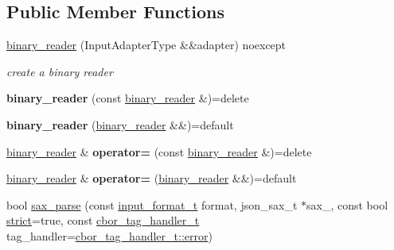 \subsection*{Public Member Functions}
\begin{DoxyCompactItemize}
\item 
\hyperlink{classnlohmann_1_1detail_1_1binary__reader_a2aee4c3507eca623f7cec32544fdc5b2}{binary\+\_\+reader} (Input\+Adapter\+Type \&\&adapter) noexcept
\begin{DoxyCompactList}\small\item\em create a binary reader \end{DoxyCompactList}\item 
\mbox{\label{classnlohmann_1_1detail_1_1binary__reader_ab29d56b1e980a7b9a3383cf1ce862d1b}} 
{\bfseries binary\+\_\+reader} (const \hyperlink{classnlohmann_1_1detail_1_1binary__reader}{binary\+\_\+reader} \&)=delete
\item 
\mbox{\label{classnlohmann_1_1detail_1_1binary__reader_acca2c4076df85f27dc1c904475e05c26}} 
{\bfseries binary\+\_\+reader} (\hyperlink{classnlohmann_1_1detail_1_1binary__reader}{binary\+\_\+reader} \&\&)=default
\item 
\mbox{\label{classnlohmann_1_1detail_1_1binary__reader_a35abcd6b3231a4c9d651f9c0eb610c96}} 
\hyperlink{classnlohmann_1_1detail_1_1binary__reader}{binary\+\_\+reader} \& {\bfseries operator=} (const \hyperlink{classnlohmann_1_1detail_1_1binary__reader}{binary\+\_\+reader} \&)=delete
\item 
\mbox{\label{classnlohmann_1_1detail_1_1binary__reader_ad3dc8b0f8ef6035465c14ed7dcbb67d4}} 
\hyperlink{classnlohmann_1_1detail_1_1binary__reader}{binary\+\_\+reader} \& {\bfseries operator=} (\hyperlink{classnlohmann_1_1detail_1_1binary__reader}{binary\+\_\+reader} \&\&)=default
\item 
bool \hyperlink{classnlohmann_1_1detail_1_1binary__reader_ab4afd9ee276bbb15a0f898061aad94dd}{sax\+\_\+parse} (const \hyperlink{namespacenlohmann_1_1detail_aa554fc6a11519e4f347deb25a9f0db40}{input\+\_\+format\+\_\+t} format, json\+\_\+sax\+\_\+t $\ast$sax\+\_\+, const bool \hyperlink{namespacenlohmann_1_1detail_a5a76b60b26dc8c47256a996d18d967dfa2133fd717402a7966ee88d06f9e0b792}{strict}=true, const \hyperlink{namespacenlohmann_1_1detail_a58bb1ef1a9ad287a9cfaf1855784d9ac}{cbor\+\_\+tag\+\_\+handler\+\_\+t} tag\+\_\+handler=\hyperlink{namespacenlohmann_1_1detail_a58bb1ef1a9ad287a9cfaf1855784d9acacb5e100e5a9a3e7f6d1fd97512215282}{cbor\+\_\+tag\+\_\+handler\+\_\+t\+::error})
\end{DoxyCompactItemize}


